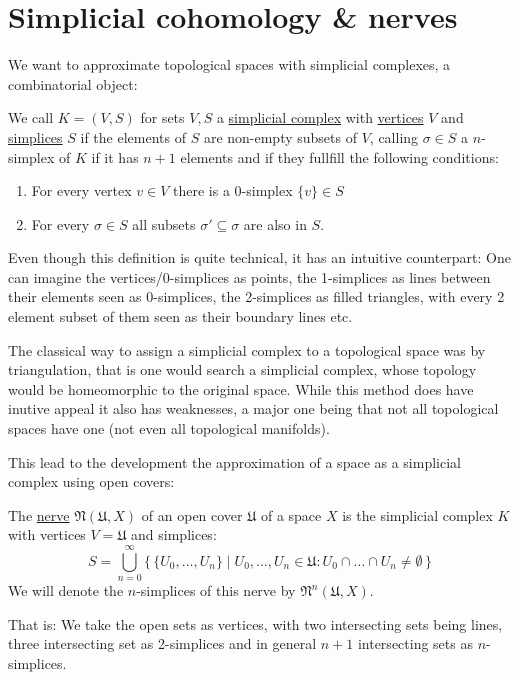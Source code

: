 \section{Simplicial cohomology \& nerves}
We want to approximate topological spaces with simplicial complexes, a combinatorial
object:
\begin{definition}
We call $K = (V, S)$ for sets $V,S$ a \underline{simplicial complex} with
\underline{vertices} $V$ and \underline{simplices} $S$ if the elements of $S$
are non-empty subsets of $V$, calling $\sigma \in S$ a $n$-simplex of $K$ if
it has $n + 1$ elements and if they fullfill the following conditions:
\begin{enumerate}
	\item For every vertex $v \in V$ there is a 0-simplex $\{v\} \in S$
	\item For every $\sigma \in S$ all subsets $\sigma' \subseteq \sigma$
		are also in $S$.
\end{enumerate}
\end{definition}
Even though this definition is quite technical, it has an intuitive counterpart:
One can imagine the vertices/0-simplices as points, the 1-simplices as lines between
their elements seen as 0-simplices, the 2-simplices as filled triangles, with
every 2 element subset of them seen as their boundary lines etc.


The classical way to assign a simplicial complex to a topological space was by triangulation,
that is one would search a simplicial complex, whose topology would be homeomorphic to
the original space. While this method does have inutive appeal it also has weaknesses,
a major one being that not all topological spaces have one (not even all topological
manifolds).

This lead to the development the approximation of a space as a simplicial complex using
open covers:
\begin{definition}
	The \underline{nerve} $\mathfrak{N}(\mathfrak{U}, X)$ of an open cover
	$\mathfrak{U}$ of a space $X$ is the simplicial complex $K$ with
	vertices $V = \mathfrak{U}$ and simplices:
	\[
		S = \bigcup_{n = 0}^\infty
			\{\,
				\{ U_0, \dots, U_n \}
				\mid
				U_0, \dots, U_n \in \mathfrak{U}:
				U_0 \cap \dots \cap U_n \neq \emptyset
			\,\}
	\]
	We will denote the $n$-simplices of this nerve by $\mathfrak{N}^n(\mathfrak{U}, X)$.
\end{definition}
That is: We take the open sets as vertices, with two intersecting sets being lines, three intersecting
set as 2-simplices and in general $n + 1$ intersecting sets as $n$-simplices.

